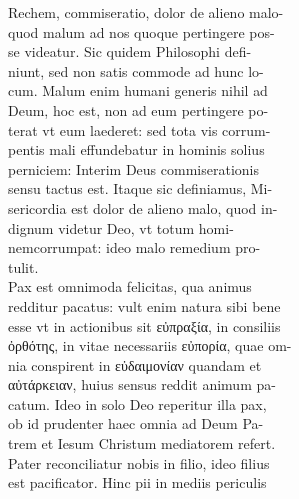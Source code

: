 \documentclass{article}
\begin{document}
\begin{pages}
                Rechem, commiseratio, dolor de alieno malo- \\
                quod malum ad nos quoque pertingere pos- \\
                se videatur. Sic quidem Philosophi defi- \\
                niunt, sed non satis commode ad hunc lo- \\
                cum. Malum enim humani generis nihil ad \\
                Deum, hoc est, non ad eum pertingere po- \\
                terat vt eum laederet: sed tota vis corrum- \\
                pentis mali effundebatur in hominis solius \\
                perniciem: Interim Deus commiserationis \\
                sensu tactus est. Itaque sic definiamus, Mi- \\
                sericordia est dolor de alieno malo, quod in- \\
                dignum videtur Deo, vt totum homi- \\
                nemcorrumpat: ideo malo remedium pro- \\
                tulit. \\
                Pax est omnimoda felicitas, qua animus \\
                redditur pacatus: vult enim natura sibi bene \\
                esse vt in actionibus sit εὐπραξία, in consiliis \\
                ὀρθότης, in vitae necessariis εὐπορία, quae om- \\
                nia conspirent in εὐδαιμονίαν quandam et \\
                αὐτάρκειαν, huius sensus reddit animum pa- \\
                catum. Ideo in solo Deo reperitur illa pax, \\
                ob id prudenter haec omnia ad Deum Pa- \\
                trem et Iesum Christum mediatorem refert. \\
                Pater reconciliatur nobis in filio, ideo filius \\
                est pacificator. Hinc pii in mediis periculis \\

\end{pages}
\end{document}
